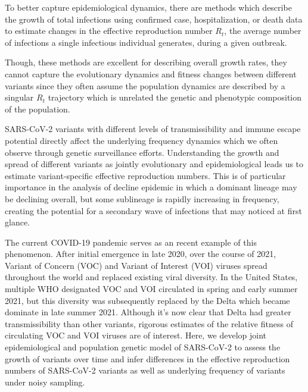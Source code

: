 \documentclass[11pt,oneside,letterpaper]{article}
\begin{document}

To better capture epidemiological dynamics, there are methods which describe the growth of total infections using confirmed case, hospitalization, or death data to estimate changes in the effective reproduction number $R_{t}$, the average number of infections a single infectious individual generates, during a given outbreak.

Though, these methods are excellent for describing overall growth rates, they cannot capture the evolutionary dynamics and fitness changes between different variants since they often assume the population dynamics are described by a singular $R_{t}$ trajectory \cites{Cori2013, Abbott2020} which is unrelated the genetic and phenotypic composition of the population. %

SARS-CoV-2 variants with different levels of transmissibility and immune escape potential directly affect the underlying frequency dynamics which we often observe through genetic surveillance efforts.
Understanding the growth and spread of different variants as jointly evolutionary and epidemiological leads us to estimate variant-specific effective reproduction numbers.
This is of particular importance in the analysis of decline epidemic in which a dominant lineage may be declining overall, but some sublineage is rapidly increasing in frequency, creating the potential for a secondary wave of infections that may noticed at first glance.


The current COVID-19 pandemic serves as an recent example of this phenomenon.
After initial emergence in late 2020, over the course of 2021, Variant of Concern (VOC) and Variant of Interest (VOI) viruses spread throughout the world and replaced existing viral diversity.
In the United States, multiple WHO designated \cite{Konings2021} VOC and VOI circulated in spring and early summer 2021, but this diversity was subsequently replaced by the Delta which became dominate in late summer 2021.
Although it's now clear that Delta had greater transmissibility than other variants, rigorous estimates of the relative fitness of circulating VOC and VOI viruses are of interest.
Here, we develop joint epidemiological and population genetic model of SARS-CoV-2 to assess the growth of variants over time and infer differences in the effective reproduction numbers of SARS-CoV-2 variants as well as underlying frequency of variants under noisy sampling.
\end{document}
